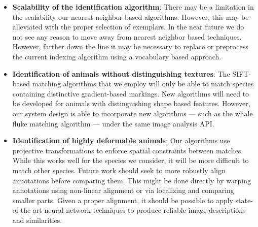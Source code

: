         \begin{itemize}


            \item \textbf{Scalability of the identification algorithm}:
            There may be a limitation in the scalability our nearest-neighbor
              based algorithms.
            However, this may be alleviated with the proper selection of
              exemplars.
            In the near future we do not see any reason to move away from
              nearest neighbor based techniques.
            However, farther down the line it may be necessary to replace or
              preprocess the current indexing algorithm using a vocabulary based
              approach.

            \item \textbf{Identification of animals without distinguishing textures}:
            The SIFT-based matching algorithms that we employ will only be
              able to match species containing distinctive gradient-based
              markings.
            New algorithms will need to be developed for animals with
              distinguishing shape based features.
            However, our system design is able to incorporate new algorithms
              --- such as the whale fluke matching algorithm --- under the same
              image analysis API{}.

            \item \textbf{Identification of highly deformable animals}:
            Our algorithms use projective transformations to enforce spatial
              constraints between matches.
            While this works well for the species we consider, it will be more
              difficult to match other species.
            Future work should seek to more robustly align annotations before
              comparing them.
            This might be done directly by warping annotations using
              non-linear alignment
            or via localizing and comparing smaller parts.
            Given a proper alignment, it should be possible to apply
              state-of-the-art neural network techniques to produce reliable
              image descriptions and similarities.


\end{itemize}
